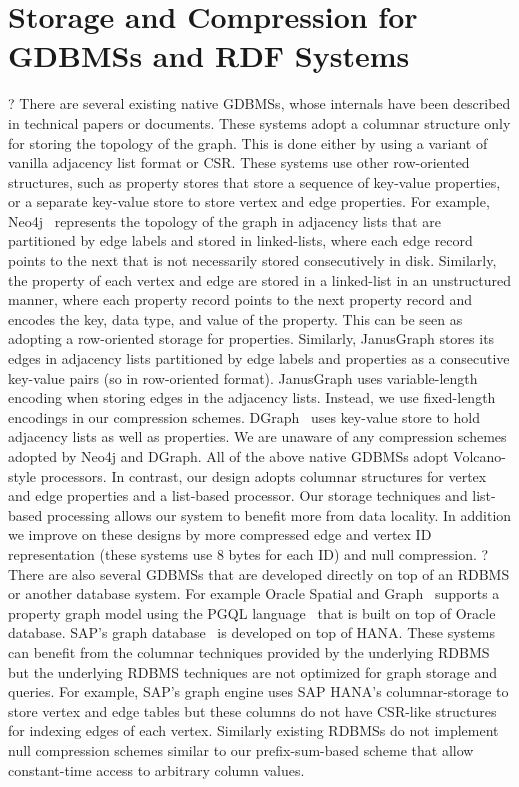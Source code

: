 \section{Storage and Compression for GDBMSs and RDF Systems}
\label{sec:gdbms-storage-and-compression}
?
There are several existing native GDBMSs, whose internals have been described in technical papers or documents. These systems adopt a columnar structure only for storing the topology of the graph. This is done either by using a variant of vanilla adjacency list format or CSR. These systems use other row-oriented structures, such as property stores that store a sequence of key-value properties, or a separate key-value store to store vertex and edge properties. For example, Neo4j~\cite{neo4j} represents the topology of the graph in adjacency lists that are partitioned by edge labels and stored in linked-lists, where each edge record points to the next that is not necessarily stored consecutively in disk. Similarly, the property of each vertex and edge are stored in a linked-list in an unstructured manner, where each property record points to the next property record and encodes the key, data type, and value of the property. This can be seen as adopting a row-oriented storage for properties. Similarly, JanusGraph \cite{janusgraph} stores its edges in adjacency lists partitioned by edge labels and properties as a consecutive key-value pairs (so in row-oriented format). JanusGraph uses variable-length encoding when storing edges in the adjacency lists. Instead, we use fixed-length encodings in our compression schemes. DGraph~\cite{dgraph} uses key-value store to hold adjacency lists as well as properties.  We are unaware of any compression schemes adopted by Neo4j and DGraph. All of the above native GDBMSs adopt Volcano-style processors. In contrast, our design adopts columnar structures for vertex and edge properties and a list-based processor. Our storage techniques and list-based processing allows our system to benefit more from data locality. In addition we improve on these designs by more compressed edge and vertex ID representation (these systems use 8 bytes for each ID) and null compression.
?
There are also several GDBMSs that are developed directly on top of an RDBMS or another database system. For example Oracle Spatial and Graph~\cite{oracle} supports a property graph model using the PGQL language~\cite{pgql} that is built on top of Oracle database. SAP's graph database~\cite{hana-graph} is developed on top of HANA. These systems can benefit from the columnar techniques provided by the underlying RDBMS but the underlying RDBMS techniques are not optimized for graph storage and queries. For example, SAP's graph engine uses SAP HANA's columnar-storage to store vertex and edge tables but these columns do not have CSR-like structures for indexing edges of each vertex. Similarly existing RDBMSs do not implement null compression schemes similar to our prefix-sum-based scheme that allow constant-time access to arbitrary column values.

